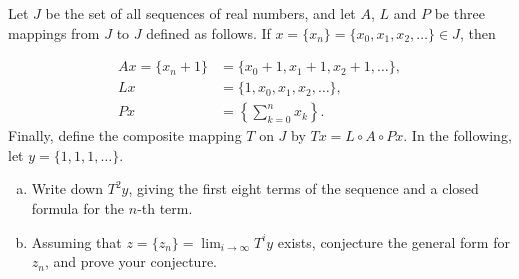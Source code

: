 Let $J$ be the set of all sequences of real numbers, and let $A$, $L$ and $P$
be three mappings from $J$ to $J$ defined as follows. If $x = \{x_n\} = \{x_0,
x_1, x_2, \dots \} \in J$, then

$$
\begin{aligned}
   Ax = \lbrace x_n + 1 \rbrace & = \lbrace x_0 + 1, x_1 + 1, x_2 + 1, \dots \rbrace, \\
 Lx & = \lbrace 1, x_0, x_1, x_2, \dots \rbrace, \\
 Px & = \left\lbrace \sum_{k=0}^{n} x_k \right\rbrace.
\end{aligned}
$$
Finally, define the composite mapping $T$ on $J$ by $T x = L \circ A \circ P
x$. In the following, let $y = \lbrace 1, 1, 1, \dots\rbrace$.

\begin{enumerate}[(a)]

\item Write down $T^2 y$, giving the first eight terms of the sequence and a
      closed formula for the $n$-th term.
\item Assuming that $z = \lbrace z_n \rbrace = \displaystyle{\lim_{i \to
      \infty} T^i y}$ exists, conjecture the general form for $z_n$, and prove
      your conjecture.

\end{enumerate}
